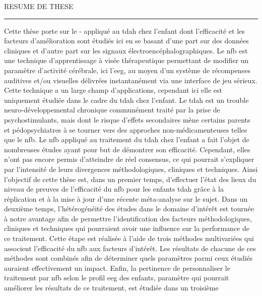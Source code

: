 
\begin{center}
\MakeUppercase{\LARGE{R}\Large{esume de these}} \\
\vspace{0mm}
\noindent\rule{16cm}{0.4pt}
\end{center}


Cette thèse porte sur le - appliqué au \gls{tdah} chez l'enfant dont l'efficacité et les facteurs d'amélioration sont 
étudiés ici en se basant d'une part sur des données cliniques et d'autre part sur les signaux électroencéphalographiques. 
Le \gls{nfb} est une technique d'apprentissage à visée thérapeutique permettant 
de modifier un paramètre d'activité cérébrale, ici l'\gls{eeg}, au moyen d’un système de récompenses auditives et/ou visuelles 
délivrées instantanément via une interface de jeu sérieux. Cette technique a un large champ d'applications, cependant ici elle est uniquement étudiée 
dans le cadre du \gls{tdah} chez l'enfant. Le \gls{tdah} est un trouble neuro-développemental chronique communément traité par la prise de psychostimulants, 
mais dont le risque d'effets secondaires mène certains parents et pédopsychiatres à se tourner vers des approches non-médicamenteuses telles que le \gls{nfb}. 
Le \gls{nfb} appliqué au traitement du \gls{tdah} chez l'enfant a fait l’objet de nombreuses études ayant pour but de démontrer son efficacité. 
Cependant, elles n'ont pas encore permis d'atteindre de réel
consensus, ce qui pourrait s'expliquer par l'intensité de leurs divergences méthodologiques, cliniques et techniques. 
Ainsi l'objectif de cette thèse est, dans un premier temps, d'effectuer l'état des lieux du niveau de preuves de l'efficacité du \gls{nfb} pour les enfants \gls{tdah} grâce
à la réplication et à la mise à jour d'une récente méta-analyse sur le sujet. Dans un 
deuxième temps, l'hétérogénéité des études dans le domaine d'intérêt est tournée à notre avantage afin de permettre 
l'identification des facteurs méthodologiques, cliniques et techniques qui pourraient avoir une influence sur la performance de ce traitement. Cette étape est réalisée
à l'aide de trois méthodes multivariées qui associent l'efficacité du \gls{nfb} aux facteurs d'intérêt. 
Les résultats de chacune de ces méthodes sont combinés afin de déterminer quels paramètres parmi ceux étudiés auraient effectivement un impact. 
Enfin, la pertinence de personnaliser le traitement par \gls{nfb} selon le profil \gls{eeg} des enfants, paramètre qui pourrait améliorer les résultats de ce traitement, est étudiée dans un troisième
